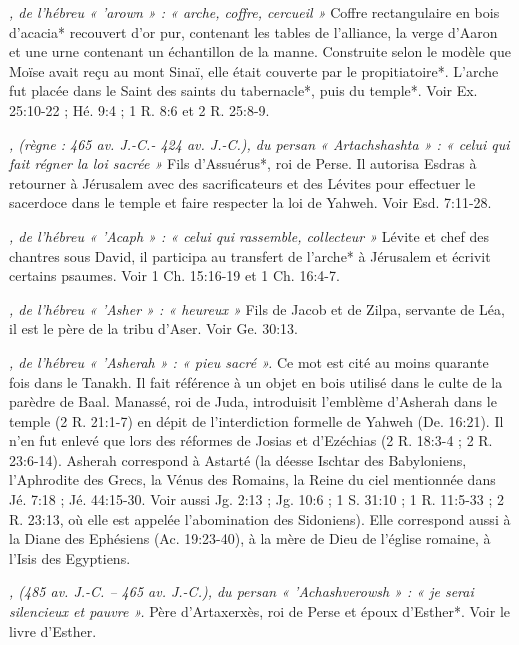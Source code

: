 \begin{multicols}{2}
{\textit{, de l'hébreu « 'arown » : « arche, coffre, cercueil »}\newline
Coffre rectangulaire en bois d'acacia* recouvert d'or pur, contenant les tables de l'alliance, la verge d'Aaron et une urne contenant un échantillon de la manne. Construite selon le modèle que Moïse avait reçu au mont Sinaï, elle était couverte par le propitiatoire*. L'arche fut placée dans le Saint des saints du tabernacle*, puis du temple*. Voir Ex. 25:10-22 ; Hé. 9:4 ; 1 R. 8:6 et 2 R. 25:8-9.

\textit{, (règne : 465 av. J.-C.- 424 av. J.-C.), du persan « Artachshashta » : « celui qui fait régner la loi sacrée »}\newline
Fils d'Assuérus*, roi de Perse. Il autorisa Esdras à retourner à Jérusalem avec des sacrificateurs et des Lévites pour effectuer le sacerdoce dans le temple et faire respecter la loi de Yahweh. Voir Esd. 7:11-28.

\textit{, de l'hébreu « 'Acaph » : « celui qui rassemble, collecteur »}\newline
Lévite et chef des chantres sous David, il participa au transfert de l'arche* à Jérusalem et écrivit certains psaumes. Voir 1 Ch. 15:16-19 et 1 Ch. 16:4-7.

\textit{, de l'hébreu « 'Asher » : « heureux »}\newline
Fils de Jacob et de Zilpa, servante de Léa, il est le père de la tribu d'Aser. Voir Ge. 30:13.

\textit{, de l'hébreu « 'Asherah » : « pieu sacré ».}\newline
Ce mot est cité au moins quarante fois dans le Tanakh. Il fait référence à un objet en bois utilisé dans le culte de la parèdre de Baal. Manassé, roi de Juda, introduisit l'emblème d'Asherah dans le temple (2 R. 21:1-7) en dépit de l'interdiction formelle de Yahweh (De. 16:21). Il n'en fut enlevé que lors des réformes de Josias et d'Ezéchias (2 R. 18:3-4 ; 2 R. 23:6-14). Asherah correspond à Astarté (la déesse Ischtar des Babyloniens, l'Aphrodite des Grecs, la Vénus des Romains, la Reine du ciel mentionnée dans Jé. 7:18 ; Jé. 44:15-30. Voir aussi Jg. 2:13 ; Jg. 10:6 ; 1 S. 31:10 ; 1 R. 11:5-33 ; 2 R. 23:13, où elle est appelée l'abomination des Sidoniens). Elle correspond aussi à la Diane des Ephésiens (Ac. 19:23-40), à la mère de Dieu de l'église romaine, à l'Isis des Egyptiens.

\textit{, (485 av. J.-C. – 465 av. J.-C.), du persan « 'Achashverowsh » : « je serai silencieux et pauvre ».}\newline
Père d'Artaxerxès, roi de Perse et époux d'Esther*. Voir le livre d'Esther.

}
\end{multicols}
